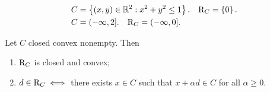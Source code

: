 \begin{example}

    \begin{align}
        C &= \left\{ (x,y) \in \mathbb{R}^2 : x^2 + y^2 \le 1 \right\}. \quad \mathrm{R}_{C} = \left\{ 0 \right\}. \\
        C &= (-\infty,2]. \quad \mathrm{R}_{C} = (-\infty,0].
    \end{align}
    
\end{example}

\begin{proposition}

    Let $C$ closed convex nonempty. Then 

    \begin{enumerate}
        \item[a)] $\mathrm{R}_{C}$ is closed and convex;
        \item[b)] $d \in \mathrm{R}_{C} \iff$ there exists $x \in C$ such that $x + \alpha d \in C$ for all $\alpha \ge 0$.
    \end{enumerate}
    
\end{proposition}

